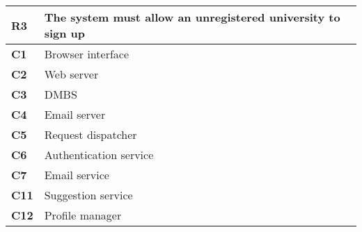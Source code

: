 \begin{table}[H]
    \centering
    \begin{tabular}{|l|m{10cm}|}
        \hline \textbf{R3} & The system must allow an unregistered university to sign up \\
        \hline \textbf{C1} & Browser interface \\
        \hline \textbf{C2} & Web server \\
        \hline \textbf{C3} & DMBS \\
        \hline \textbf{C4} & Email server \\
        \hline \textbf{C5} & Request dispatcher \\
        \hline \textbf{C6} & Authentication service \\
        \hline \textbf{C7} & Email service \\
        \hline \textbf{C11} & Suggestion service \\
        \hline \textbf{C12} & Profile manager \\
        \hline
    \end{tabular}
\end{table}

